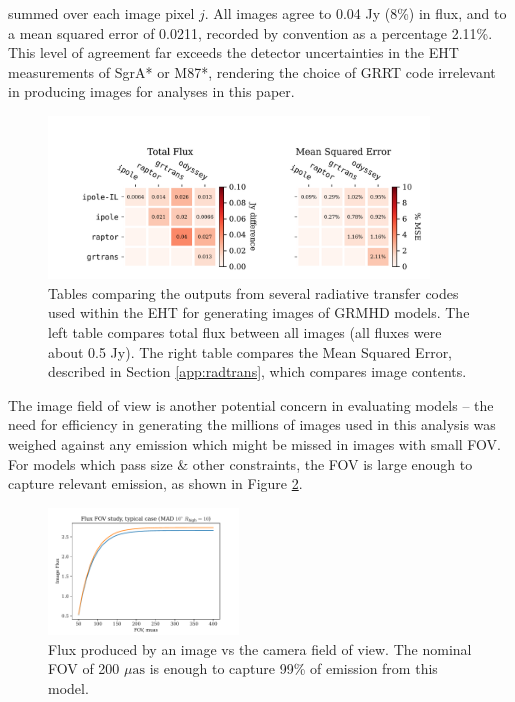 summed over each image pixel $j$. All images agree to 0.04 Jy (8\%) in flux, and to a mean squared error of 0.0211, recorded by convention as a percentage 2.11\%.  This level of agreement far exceeds the detector uncertainties in the EHT measurements of SgrA* or M87*, rendering the choice of GRRT code irrelevant in producing images for analyses in this paper.

\begin{figure}
  \centering
  \includegraphics[width=0.9\textwidth]{figures/grmhd_hi_IntegratedUnpolarizeds_plot.pdf}
  \caption{Tables comparing the outputs from several radiative transfer codes used within the EHT for generating images of GRMHD models.  The left table compares total flux between all images (all fluxes were about 0.5 Jy). The right table compares the Mean Squared Error, described in Section \ref{app:radtrans}, which compares image contents.}
  \label{fig:radtrans_grmhd_comp}
\end{figure}

The image field of view is another potential concern in evaluating models -- the need for efficiency in generating the millions of images used in this analysis was weighed against any emission which might be missed in images with small FOV.  For models which pass size \& other constraints, the FOV is large enough to capture relevant emission, as shown in Figure \ref{fig:radtrans_fov_study}.

\begin{figure}
  \centering
  \includegraphics[width=0.45\textwidth]{figures/fov_study.pdf}
  \caption{Flux produced by an image vs the camera field of view.  The nominal FOV of 200 $\mu\mathrm{as}$ is enough to capture 99\% of emission from this model.}
  \label{fig:radtrans_fov_study}
\end{figure}

